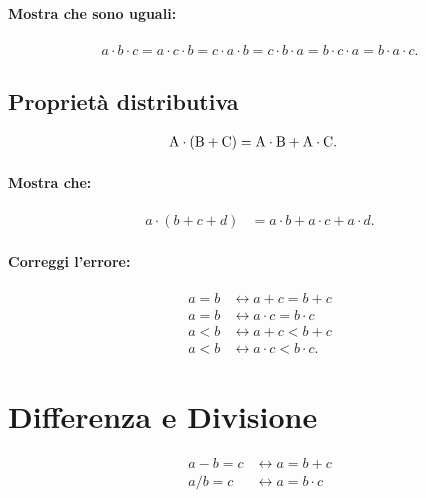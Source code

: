 \documentclass{article}
\begin{document}
\paragraph{Mostra che sono uguali:}

\begin{align*}
a \cdot b \cdot c = a \cdot c \cdot b = c \cdot a \cdot b = c \cdot b \cdot a = b \cdot c \cdot a = b \cdot a \cdot c.
\end{align*}

\subsection*{Proprietà distributiva}

\begin{align*}
{\rm A} \cdot ({\rm B} + {\rm C}) &= {\rm A} \cdot {\rm B} + {\rm A} \cdot {\rm C}.
\end{align*}

\paragraph{Mostra che:}

\begin{align*}
a \cdot (b + c + d) &= a \cdot b + a \cdot c + a \cdot d.
\end{align*}

\paragraph{Correggi l'errore:}

\begin{align*}
a = b &\longleftrightarrow a + c = b + c\\
a = b &\longleftrightarrow a \cdot c = b \cdot c\\
a < b &\longleftrightarrow a + c < b + c\\
a < b &\longleftrightarrow a \cdot c < b \cdot c.
\end{align*}

\newpage
\section*{Differenza e Divisione}

\begin{align*}
a - b = c &\longleftrightarrow a = b + c\\
a / b = c &\longleftrightarrow a = b \cdot c
\end{align*}
\end{document}
